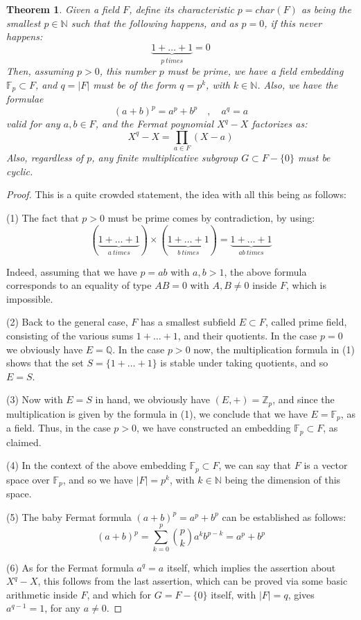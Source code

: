 \documentclass[12pt]{amsbook}
\newtheorem{theorem}{Theorem}[chapter]
\begin{document}
\begin{theorem}
Given a field $F$, define its characteristic $p=char(F)$ as being the smallest $p\in\mathbb N$ such that the following happens, and as $p=0$, if this never happens:
$$\underbrace{1+\ldots+1}_{p\ times}=0$$
Then, assuming $p>0$, this number $p$ must be prime, we have a field embedding $\mathbb F_p\subset F$, and $q=|F|$ must be of the form $q=p^k$, with $k\in\mathbb N$. Also, we have the formulae
$$(a+b)^p=a^p+b^p\quad,\quad a^q=a$$
valid for any $a,b\in F$, and the Fermat poynomial $X^q-X$ factorizes as:
$$X^q-X=\prod_{a\in F}(X-a)$$
Also, regardless of $p$, any finite multiplicative subgroup $G\subset F-\{0\}$ must be cyclic.
\end{theorem}

\begin{proof}
This is a quite crowded statement, the idea with all this being as follows:

\medskip

(1) The fact that $p>0$ must be prime comes by contradiction, by using:
$$(\underbrace{1+\ldots+1}_{a\ times})\times(\underbrace{1+\ldots+1}_{b\ times})=\underbrace{1+\ldots+1}_{ab\ times}$$

Indeed, assuming that we have $p=ab$ with $a,b>1$, the above formula corresponds to an equality of type $AB=0$ with $A,B\neq0$ inside $F$, which is impossible.

\medskip

(2) Back to the general case, $F$ has a smallest subfield $E\subset F$, called prime field, consisting of the various sums $1+\ldots+1$, and their quotients. In the case $p=0$ we obviously have $E=\mathbb Q$. In the case $p>0$ now, the multiplication formula in (1) shows that the set $S=\{1+\ldots+1\}$ is stable under taking quotients, and so $E=S$.

\medskip

(3) Now with $E=S$ in hand, we obviously have $(E,+)=\mathbb Z_p$, and since the multiplication is given by the formula in (1), we conclude that we have $E=\mathbb F_p$, as a field. Thus, in the case $p>0$, we have constructed an embedding $\mathbb F_p\subset F$, as claimed.

\medskip

(4) In the context of the above embedding $\mathbb F_p\subset F$, we can say that $F$ is a vector space over $\mathbb F_p$, and so we have $|F|=p^k$, with $k\in\mathbb N$ being the dimension of this space.

\medskip

(5) The baby Fermat formula $(a+b)^p=a^p+b^p$ can be established as follows:
$$(a+b)^p=\sum_{k=0}^p\binom{p}{k}a^kb^{p-k}=a^p+b^p$$

(6) As for the Fermat formula $a^q=a$ itself, which implies the assertion about $X^q-X$, this follows from the last assertion, which can be proved via some basic arithmetic inside $F$, and which for $G=F-\{0\}$ itself, with $|F|=q$, gives $a^{q-1}=1$, for any $a\neq0$.
\end{proof}
\end{document}

